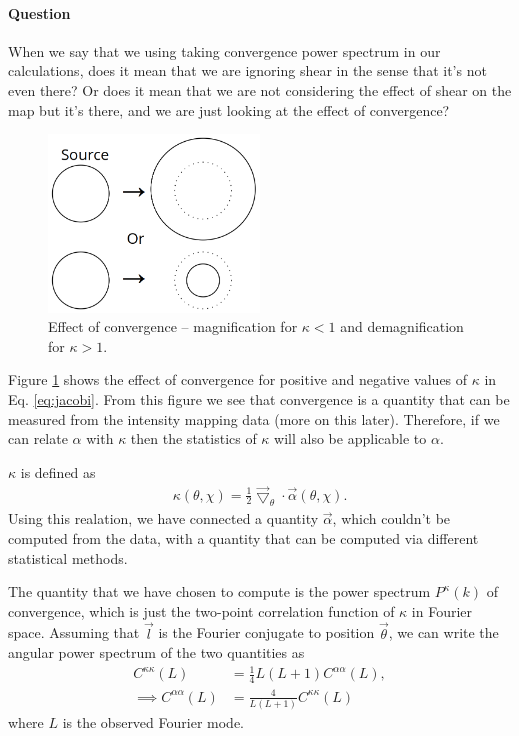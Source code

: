 \documentclass[12pt]{article}
\numberwithin{equation}{section}
\begin{document}
\paragraph{Question} When we say that we using taking convergence power spectrum 
in our calculations, does it mean that we are ignoring shear in the sense that it's not even there? Or does it mean that we are not considering the effect of shear on the map but it's there, and we are just looking at the effect of convergence?

\begin{figure}[tbp]
	\centering
	\includegraphics[width=0.5\textwidth]{convergence}
	\caption{Effect of convergence -- magnification for $ \kappa < 1 $ and demagnification for $ \kappa > 1$.}
	\label{fig:convergence}
\end{figure}

Figure \ref{fig:convergence} shows the effect of convergence for positive and negative values of $ \kappa $ in Eq. \eqref{eq:jacobi}. From this figure we see that convergence is a quantity that can be measured from the intensity mapping data (more on this later). Therefore, if we can relate $ \alpha $  with $ \kappa $ then the statistics of $\kappa$ will also be applicable to $ \alpha $.

$\kappa$ is defined as 
\begin{align}
\kappa(\theta, \chi) = \frac{1}{2} \vec{\bigtriangledown}_\theta \cdot \vec{\alpha}(\theta, \chi).
\end{align}
Using this realation, we have connected a quantity $\vec{\alpha}$, which couldn't be computed from the data, with a quantity that can be computed via different statistical methods.

The quantity that we have chosen to compute is the power spectrum $ P^\kappa(k) $ of convergence, which is just the two-point correlation function of $\kappa$ in Fourier space. Assuming that $ \vec{l} $ is the Fourier conjugate to position $ \vec{\theta} $, we can write the angular power spectrum of the two quantities as 
\begin{align}
C^{\kappa\kappa}(L) &= \frac{1}{4}L(L+1) C^{\alpha\alpha}(L),\\
\implies C^{\alpha\alpha}(L) &= \frac{4}{L(L+1)} C^{\kappa\kappa}(L) \label{eq:disp_field_pow_spec}
\end{align}
where $ L $ is the observed Fourier mode. 
\end{document}
